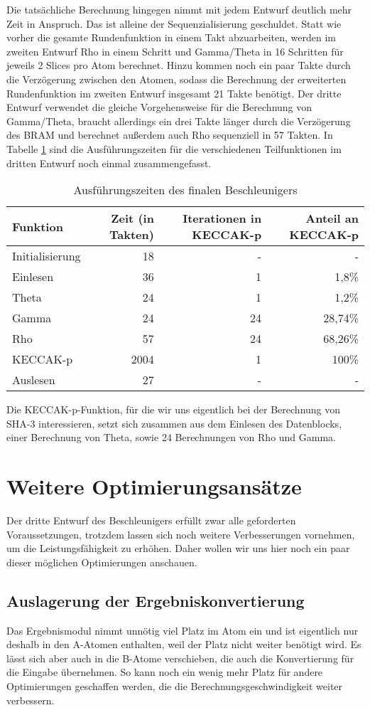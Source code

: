 Die tatsächliche Berechnung hingegen nimmt mit jedem Entwurf deutlich mehr Zeit in Anspruch. Das ist alleine der Sequenzialisierung geschuldet.
Statt wie vorher die gesamte Rundenfunktion in einem Takt abzuarbeiten, werden im zweiten Entwurf Rho in einem Schritt und Gamma/Theta in 16 Schritten für jeweils 2 Slices pro Atom berechnet.
Hinzu kommen noch ein paar Takte durch die Verzögerung zwischen den Atomen, sodass die Berechnung der erweiterten Rundenfunktion im zweiten Entwurf insgesamt 21 Takte benötigt.
Der dritte Entwurf verwendet die gleiche Vorgehensweise für die Berechnung von Gamma/Theta, braucht allerdings ein drei Takte länger durch die Verzögerung des BRAM
und berechnet außerdem auch Rho sequenziell in 57 Takten. In Tabelle \ref{tab:zeiten_iteration_3} sind die Ausführungszeiten
für die verschiedenen Teilfunktionen im dritten Entwurf noch einmal zusammengefasst.
\begin{table}
    \centering
    \begin{tabular}{lrrr}
    Funktion & Zeit (in Takten) & Iterationen in KECCAK-p & Anteil an KECCAK-p \\
    \hline
    Initialisierung & 18 & - & - \\
    Einlesen & 36 & 1 & 1,8\% \\
    Theta & 24 & 1 & 1,2\% \\
    Gamma & 24 & 24 & 28,74\% \\
    Rho & 57 & 24 & 68,26\% \\
    KECCAK-p & 2004 & 1 & 100\% \\
    Auslesen & 27 & - & -
    \end{tabular}
    \label{tab:zeiten_iteration_3}
    \caption{Ausführungszeiten des finalen Beschleunigers}
\end{table}
Die KECCAK-p-Funktion, für die wir uns eigentlich bei der Berechnung von SHA-3 interessieren, setzt sich zusammen aus dem Einlesen des Datenblocks,
einer Berechnung von Theta, sowie 24 Berechnungen von Rho und Gamma.

\section{Weitere Optimierungsansätze}
Der dritte Entwurf des Beschleunigers erfüllt zwar alle geforderten Voraussetzungen, trotzdem lassen sich noch weitere Verbesserungen vornehmen, um die Leistungsfähigkeit zu erhöhen.
Daher wollen wir uns hier noch ein paar dieser möglichen Optimierungen anschauen.

\subsection{Auslagerung der Ergebniskonvertierung}
Das Ergebnismodul nimmt unnötig viel Platz im Atom ein und ist eigentlich nur deshalb in den A-Atomen enthalten, weil der Platz nicht weiter benötigt wird.
Es lässt sich aber auch in die B-Atome verschieben, die auch die Konvertierung für die Eingabe übernehmen.
So kann noch ein wenig mehr Platz für andere Optimierungen geschaffen werden, die die Berechnungsgeschwindigkeit weiter verbessern.

